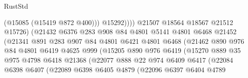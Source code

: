 \begin{lexlean}{RustStd}
\begin{coremodule}
                                        (@15085 (@15419 @872 @400)))
                                      @15292))))
                              @21507
                              @18564
                              @18567
                              @21512
                              @15726)
                            (@21432
                              @6376
                              @283
                              @908
                              @84
                              @4801
                              @5141
                              @4801
                              @6468
                              @21452
                              (@21341
                                @891
                                @283
                                @907
                                @84
                                @4801
                                @6421
                                @4801
                                @6468
                                (@21462
                                  @890
                                  @976
                                  @84
                                  @4801
                                  @6419
                                  @4625
                                  @999
                                  (@15205
                                    @890
                                    @976
                                    @6419
                                    (@15270
                                      @889
                                      @35
                                      @975
                                      @4798
                                      @6418
                                      @21368
                                      (@22077
                                        @888
                                        @22
                                        @974
                                        @6409
                                        @6417
                                        (@22084
                                          @6398
                                          @6407
                                          (@22089
                                            @6398
                                            @6405
                                            @4879
                                            (@22096
                                              @6397
                                              @6404
                                              @4789

\end{coremodule}
\end{lexlean}
